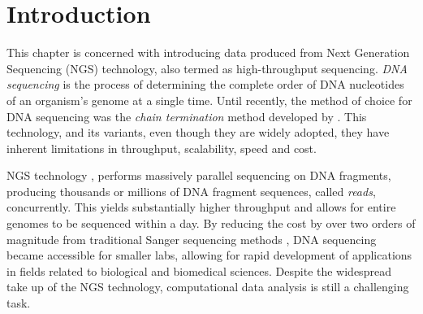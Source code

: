 \section{Introduction} \label{data-intro-sect}
This chapter is concerned with introducing data produced from Next Generation Sequencing (NGS) technology, also termed as high-throughput sequencing. \emph{DNA sequencing} is the process of determining the complete order of DNA nucleotides of an organism's genome at a single time. Until recently, the method of choice for DNA sequencing was the \emph{chain termination} method developed by \citet{Sanger1977}. This technology, and its variants, even though they are widely adopted, they have inherent limitations in throughput, scalability, speed and cost. 

NGS technology \citep{Shendure2008, Mardis2008}, performs massively parallel sequencing on DNA fragments, producing thousands or millions of DNA fragment sequences, called \emph{reads}, concurrently. This yields substantially higher throughput and allows for entire genomes to be sequenced within a day. By reducing the cost by over two orders of magnitude from traditional Sanger sequencing methods \citep{Shendure2008}, DNA sequencing became accessible for smaller labs, allowing for rapid development of applications in fields related to biological and biomedical sciences. Despite the widespread take up of the NGS technology, computational data analysis is still a challenging task.